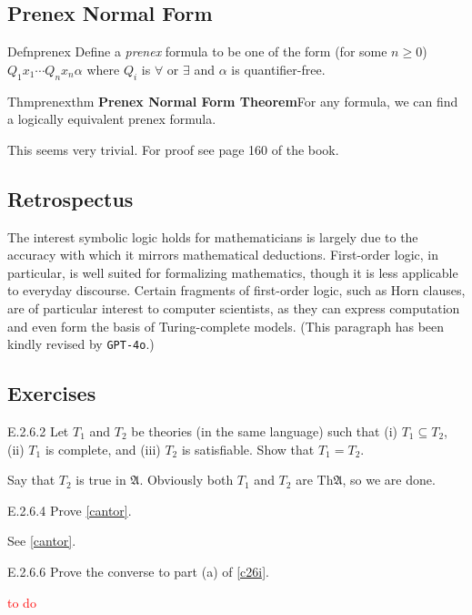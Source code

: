 \subsection*{Prenex Normal Form}

\begin{reference}{Defn}{prenex}
  Define a \textit{prenex} formula to be one of the form (for some $n\geq0$) $Q_1x_1\cdots Q_nx_n \alpha$ where $Q_i$ is $\forall$ or $\exists$ and $\alpha$ is quantifier-free.
\end{reference}

\begin{reference}{Thm}{prenexthm}
  \textbf{Prenex Normal Form Theorem}\quad For any formula, we can find a logically equivalent prenex formula.
\end{reference}

This seems very trivial. For proof see page 160 of the book.

\subsection*{Retrospectus}

The interest symbolic logic holds for mathematicians is largely due to the accuracy with which it mirrors mathematical deductions. First-order logic, in particular, is well suited for formalizing mathematics, though it is less applicable to everyday discourse. Certain fragments of first-order logic, such as Horn clauses, are of particular interest to computer scientists, as they can express computation and even form the basis of Turing-complete models. (This paragraph has been kindly revised by \texttt{GPT-4o}.)

\subsection*{Exercises}

\setcounter{exercise}{1}

\begin{exercise}{E.2.6.2}
  Let $T_1$ and $T_2$ be theories (in the same language) such that (i) $T_1\subseteq T_2$, (ii) $T_1$ is complete, and (iii) $T_2$ is satisfiable. Show that $T_1=T_2$.
\end{exercise}

Say that $T_2$ is true in $\mathfrak{A}$. Obviously both $T_1$ and $T_2$ are $\mathrm{Th}\mathfrak{A}$, so we are done.

\setcounter{exercise}{3}

\begin{exercise}{E.2.6.4}
  Prove \ref{cantor}.
\end{exercise}

See \ref{cantor}.

\setcounter{exercise}{5}

\begin{exercise}{E.2.6.6}
  Prove the converse to part (a) of \ref{c26i}.
\end{exercise}

\textcolor{red}{to do}


